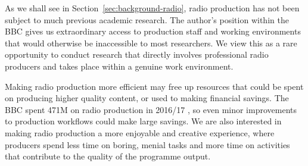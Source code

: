 




As we shall see in Section~\ref{sec:background-radio}, radio production has not been subject to much previous academic
research.  The author's position within the BBC gives us extraordinary access to production staff and working
environments that would otherwise be inaccessible to most researchers. We view this as a rare opportunity to conduct
research that directly involves professional radio producers and takes place within a genuine work environment.

Making radio production more efficient may free up resources that could be spent on producing higher quality content,
or used to making financial savings. The BBC spent \textsterling471M on radio production in 2016/17 \citep[p.
111]{Ofcom2017}, so even minor improvements to production workflows could make large savings.  We are also interested
in making radio production a more enjoyable and creative experience, where producers spend less time on boring, menial
tasks and more time on activities that contribute to the quality of the programme output.


